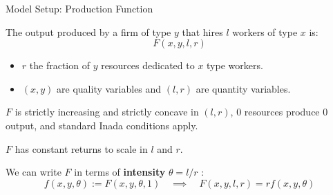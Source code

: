 \documentclass[notes,11pt, aspectratio=169]{beamer}
\newenvironment{wideitemize}{\itemize\addtolength{\itemsep}{10pt}}{\enditemize}
\begin{document}
\begin{frame}{Model Setup:  Production Function}
	\begin{wideitemize}
		\item The output produced by a firm of type $y$ that hires $l$ workers of type $x$ is: \[F(x,y,l,r)\]
		\begin{itemize}
			\item $r$ the fraction of $y$ resources dedicated to $x$ type workers.
			\item $(x,y)$ are quality variables and $(l,r)$ are quantity variables.
		\end{itemize}
		\item $F$ is strictly increasing and strictly concave in $(l,r)$, $0$ resources produce $0$ output, and standard Inada conditions apply.
		\item  $F$ has constant returns to scale in $l$ and $r$.
		\pause
		\item  We can write $F$ in terms of \textbf{intensity} $\theta=l/r$ :\[f(x,y,\theta):=F(x,y,\theta,1)\quad \implies \quad F(x,y,l,r) = rf(x,y,\theta)\]
	\end{wideitemize}
\end{frame}
\end{document}
